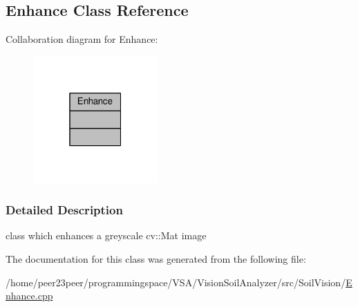 \hypertarget{class_enhance}{}\subsection{Enhance Class Reference}
\label{class_enhance}


Collaboration diagram for Enhance\+:
\nopagebreak
\begin{figure}[H]
\begin{center}
\leavevmode
\includegraphics[width=135pt]{class_enhance__coll__graph}
\end{center}
\end{figure}


\subsubsection{Detailed Description}
class which enhances a greyscale cv\+::\+Mat image 

The documentation for this class was generated from the following file\+:\begin{DoxyCompactItemize}
\item 
/home/peer23peer/programmingspace/\+V\+S\+A/\+Vision\+Soil\+Analyzer/src/\+Soil\+Vision/\hyperlink{_enhance_8cpp}{Enhance.\+cpp}\end{DoxyCompactItemize}
